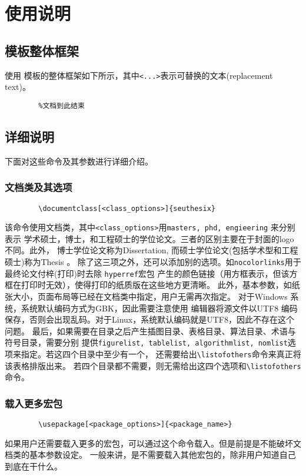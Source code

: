 \documentclass[figurelist,tablelist,algorithmlist,nomlist,masters]{seuthesix}
\begin{document}
	\chapter{使用说明}
	
	\section{模板整体框架}
	使用 \seuthesix 模板的整体框架如下所示，其中\verb+<...>+表示可替换的文本(replacement text)。
	{\color{magenta}
		\begin{verbatim}
		%文档到此结束
		\end{verbatim}
	}
	
	\section{详细说明}
	下面对这些命令及其参数进行详细介绍。
	\subsection{文档类及其选项}
	
	{\color{magenta}
		\begin{verbatim}
		\documentclass[<class_options>]{seuthesix}
		\end{verbatim}
	}
	该命令使用\seuthesix 文档类，其中\verb+<class_options>+用\texttt{masters, phd, engieering} 来分别表示
	学术硕士，博士，和工程硕士的学位论文。三者的区别主要在于封面的logo 不同。此外，
	博士学位论文称为Dissertation, 而硕士学位论文(包括学术型和工程硕士)称为Thesis 。
	除了这三项之外，还可以添加别的选项。如{\texttt{nocolorlinks}}用于最终论文付梓(打印)时去除
	\texttt{hyperref}宏包
	产生的颜色链接（用方框表示，但该方框在打印时无效），使得打印的纸质版在这些地方更清晰。
	此外，基本参数，如纸张大小，页面布局等已经在文档类中指定，用户无需再次指定。
	对于Windows 系统，系统默认编码方式为GBK，因此需要注意使用
	编辑器将源文件以UTF8 编码保存，否则会出现乱码。对于Linux，系统默认编码就是UTF8，因此不存在这个问题。
	最后，如果需要在目录之后产生插图目录、表格目录、算法目录、术语与符号目录，需要分别
	提供\texttt{figurelist, tablelist, algorithmlist, nomlist}选项来指定。若这四个目录中至少有一个，
	还需要给出\verb+\listofothers+命令来真正将该表格排版出来。
	若四个目录都不需要，则无需给出这四个选项和\verb+\listofothers+命令。
	\subsection{载入更多宏包}
	{\color{magenta}
		\begin{verbatim}
		\usepackage[<package_options>]{<package_name>}
		\end{verbatim}
	}
	如果用户还需要载入更多的宏包，可以通过这个命令载入。但是前提是不能破坏\seuthesix 文档类的基本参数设定。
	一般来讲，是不需要载入其他宏包的，除非用户知道自己到底在干什么。
	
\end{document}
